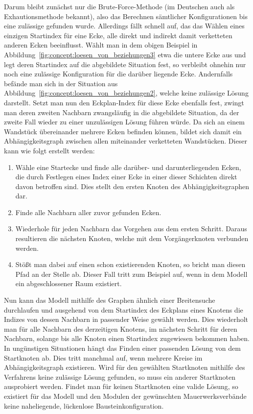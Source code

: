 Darum bleibt zunächst nur die Brute-Force-Methode (im Deutschen auch als Exhautionsmethode bekannt), also das Berechnen sämtlicher Konfigurationen bis eine zulässige gefunden wurde.
Allerdings fällt schnell auf, das das Wählen eines einzigen Startindex für eine Ecke, alle direkt und indirekt damit verketteten anderen Ecken beeinflusst.
Wählt man in dem obigen Beispiel in Abbildung~\ref{fig:concept:loesen_von_beziehungen3} etwa die untere Ecke aus und legt deren Startindex auf die abgebildete Situation fest, so verbleibt ohnehin nur noch eine zulässige Konfiguration für die darüber liegende Ecke.
Andernfalls befände man sich in der Situation aus Abbildung~\ref{fig:concept:loesen_von_beziehungen2}, welche keine zulässige Lösung darstellt.
Setzt man nun den Eckplan-Index für diese Ecke ebenfalls fest, zwingt man deren zweiten Nachbarn zwangsläufig in die abgebildete Situation, da der zweite Fall wieder zu einer unzulässigen Lösung führen würde.
Da sich an einem Wandstück übereinander mehrere Ecken befinden können, bildet sich damit ein Abhängigkeitsgraph zwischen allen miteinander verketteten Wandstücken.
Dieser kann wie folgt erstellt werden:

\begin{enumerate}
    \item Wähle eine Startecke und finde alle darüber- und darunterliegenden Ecken, die durch Festlegen eines Index einer Ecke in einer dieser Schichten direkt davon betroffen sind. Dies stellt den ersten Knoten des Abhängigkeitsgraphen dar.
    \item Finde alle Nachbarn aller zuvor gefunden Ecken.
    \item Wiederhole für jeden Nachbarn das Vorgehen aus dem ersten Schritt. Daraus resultieren die nächsten Knoten, welche mit dem Vorgängerknoten verbunden werden.
    \item Stößt man dabei auf einen schon existierenden Knoten, so bricht man diesen Pfad an der Stelle ab. Dieser Fall tritt zum Beispiel auf, wenn in dem Modell ein abgeschlossener Raum existiert.
\end{enumerate}

Nun kann das Modell mithilfe des Graphen ähnlich einer Breitensuche durchlaufen und ausgehend von dem Startindex des Eckplans eines Knotens die Indizes von dessen Nachbarn in passender Weise gewählt werden.
Dies wiederholt man für alle Nachbarn des derzeitigen Knotens, im nächsten Schritt für deren Nachbarn, solange bis alle Knoten einen Startindex zugewiesen bekommen haben.
In ungünstigen Situationen hängt das Finden einer passenden Lösung von dem Startknoten ab.
Dies tritt manchmal auf, wenn mehrere Kreise im Abhängigkeitsgraph existieren.
Wird für den gewählten Startknoten mithilfe des Verfahrens keine zulässige Lösung gefunden, so muss ein anderer Startknoten ausprobiert werden.
Findet man für keinen Startknoten eine valide Lösung, so existiert für das Modell und den Modulen der gewünschten Mauerwerksverbände keine naheliegende, lückenlose Bausteinkonfiguration.

